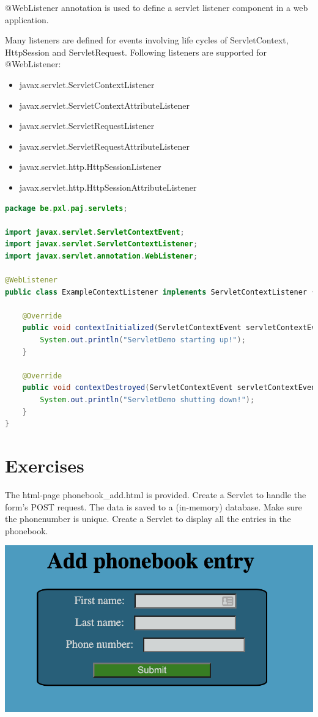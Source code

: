 @WebListener annotation is used to define a servlet listener component in a web application.

Many listeners are defined for events involving life cycles of ServletContext, HttpSession and ServletRequest.  Following listeners are supported for @WebListener:

\begin{itemize}
\item javax.servlet.ServletContextListener
\item javax.servlet.ServletContextAttributeListener
\item javax.servlet.ServletRequestListener
\item javax.servlet.ServletRequestAttributeListener
\item javax.servlet.http.HttpSessionListener
\item javax.servlet.http.HttpSessionAttributeListener
\end{itemize}


\begin{lstlisting}[language=java, frame=single]
package be.pxl.paj.servlets;

import javax.servlet.ServletContextEvent;
import javax.servlet.ServletContextListener;
import javax.servlet.annotation.WebListener;

@WebListener
public class ExampleContextListener implements ServletContextListener {

	@Override
	public void contextInitialized(ServletContextEvent servletContextEvent) {
		System.out.println("ServletDemo starting up!");
	}

	@Override
	public void contextDestroyed(ServletContextEvent servletContextEvent) {
		System.out.println("ServletDemo shutting down!");
	}
}
\end{lstlisting}

\section{Exercises}

\begin{oefening}
The html-page phonebook\_add.html is provided. Create a Servlet to handle the form’s POST request. The data is saved to a (in-memory) database. Make sure the phonenumber is unique.  Create a Servlet to display all the entries in the phonebook. 
\end{oefening}

\includegraphics{./images/chapter8/add_phonebook_entry}

